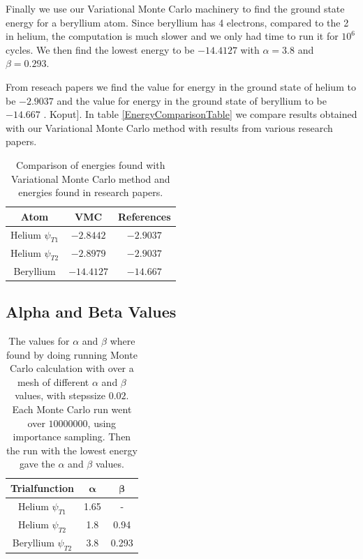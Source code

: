 \documentclass[11pt]{article}
\begin{document}
Finally we use our Variational Monte Carlo machinery to find the ground
state energy for a beryllium atom. Since beryllium has 4 electrons,
compared to the 2 in helium, the computation is much slower and we
only had time to run it for $10^{6}$ cycles. We then find the lowest
energy to be $-14.4127$ with $\alpha=3.8$ and $\beta=0.293$. 

From reseach papers we find the value for energy in the ground state
of helium to be $-2.9037$ \cite{Kinoshita:1957:PR} and the value 
for energy in the ground state of beryllium to be $-14.667$ \cite{Koput:2011:PCCP}.
Koput{]}. In table \ref{EnergyComparisonTable} we compare results
obtained with our Variational Monte Carlo method with results from
various research papers. 

\begin{table}
\centering %
\begin{tabular}{|c|c|c|}
\hline 
Atom & VMC & References\tabularnewline
\hline 
\hline 
Helium $\psi_{T1}$ & $-2.8442$ & $-2.9037$ \tabularnewline
\hline 
Helium $\psi_{T2}$ & $-2.8979$ & $-2.9037$ \tabularnewline
\hline 
Beryllium & $-14.4127$ & $-14.667$\tabularnewline
\hline 
\end{tabular}

\protect\caption{Comparison of energies found with Variational Monte Carlo method and
energies found in research papers.}


\end{table}

\subsection{Alpha and Beta Values}

\begin{table}
\center
		\begin{tabular}{| c | c| c |}
		    \hline
		   	\textbf{Trialfunction} & \(\mathbf{\alpha}\) & \(\mathbf{\beta}\)
		    \\ \hline
		    Helium $\psi_{T1}$ & 1.65 & -
		    \\ \hline 
		    Helium $\psi_{T2}$ & 1.8 & 0.94
		    \\	\hline 
		    Beryllium $\psi_{T2}$	& 3.8	&	 0.293
		    \\ \hline
	  \end{tabular}
	  \caption{The values for \(\alpha\) and \( \beta \) where found by doing running Monte Carlo calculation with over a mesh of different \(\alpha\) and \( \beta \) values, with stepssize \(0.02\). Each Monte Carlo run went over \(10 000 000\), using importance sampling. Then the run with the lowest energy gave the \(\alpha\) and \(\beta\) values.}
	  \label{tab:alpha_beta}
\end{table}
\end{document}
